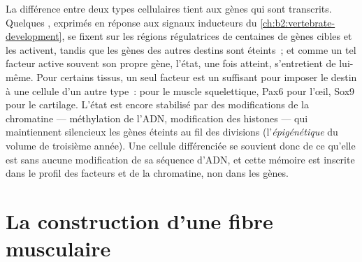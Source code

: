\begin{proposition}\label{prop:b2:cell-differentiation:transcriptional}
La différence entre deux types cellulaires tient aux gènes qui sont
transcrits. Quelques \emph{}, exprimés en
réponse aux signaux inducteurs du
\cref{ch:b2:vertebrate-development}, se fixent sur les régions
régulatrices de centaines de gènes cibles et les activent, tandis que
les gènes des autres destins sont éteints~; et comme un tel facteur
active souvent son propre gène, l'état, une fois atteint, s'entretient
de lui-même. Pour certains tissus, un seul facteur est un
\emph{} suffisant pour imposer le destin à une cellule
d'un autre type~:  pour le muscle squelettique, Pax6 pour l'œil,
Sox9 pour le cartilage. L'état est encore stabilisé par des
modifications de la chromatine --- méthylation de l'ADN, modification
des histones --- qui maintiennent silencieux les gènes éteints au fil
des divisions (l'\emph{épigénétique} du volume de troisième année). Une
cellule différenciée se souvient donc de ce qu'elle est sans aucune
modification de sa séquence d'ADN, et cette mémoire est inscrite dans
le profil des facteurs et de la chromatine, non dans les gènes.
\end{proposition}

\section{La construction d'une fibre musculaire}

